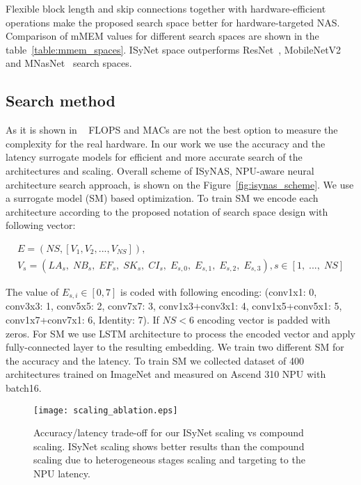 \documentclass[letterpaper]{article}
\begin{document}
Flexible block length and skip connections together with hardware-efficient operations make the proposed search space better for hardware-targeted NAS.
Comparison of mMEM values for different search spaces are shown in the table~\ref{table:mmem_spaces}.
ISyNet space outperforms ResNet~\cite{he2015deep}, MobileNetV2~\cite{sandler2019mobilenetv2} and MNasNet~\cite{tan2019mnasnet} search spaces.

\subsection{Search method}

As it is shown in ~\cite{radosavovic2020designing,gupta2020acceleratoraware} FLOPS and MACs are not the best option to measure the complexity for the real hardware. In our work we use the accuracy and the latency surrogate models for efficient and more accurate search of the architectures and scaling. Overall scheme of ISyNAS, NPU-aware neural architecture search approach, is shown on the Figure~\ref{fig:isynas_scheme}. We use a surrogate model (SM) based optimization. To train SM we encode each architecture according to the proposed notation of search space design with following vector:

\begin{equation}
\begin{gathered}
E = ( NS, [V_1, V_2, ..., V_{NS}]), \\
V_s = (LA_s,\;NB_s,\;EF_s,\;SK_s,\;CI_s,\;E_{s,0},\;E_{s,1},\;E_{s,2},\;E_{s,3}), s \in [1,\;...,\;NS]
\end{gathered}
\end{equation}

The value of $E_{s,i}\in[0,7]$ is coded with following encoding: (conv1x1: 0, conv3x3: 1, conv5x5: 2, conv7x7: 3, conv1x3+conv3x1: 4, conv1x5+conv5x1: 5, conv1x7+conv7x1: 6, Identity: 7). If $NS<6$ encoding vector is padded with zeros. For SM we use LSTM architecture to process the encoded vector and apply fully-connected layer to the resulting embedding. We train two different SM for the accuracy and the latency. To train SM we collected dataset of 400 architectures trained on ImageNet and measured on Ascend 310 NPU with batch16.

\begin{wrapfigure}[22]{r}{70mm}
\texttt{[image: scaling\_ablation.eps]}
\caption{Accuracy/latency trade-off for our ISyNet scaling vs compound scaling. ISyNet scaling shows better results than the compound scaling due to heterogeneous stages scaling and targeting to the NPU latency.}
\label{fig:scaling}
\end{wrapfigure}
\end{document}
